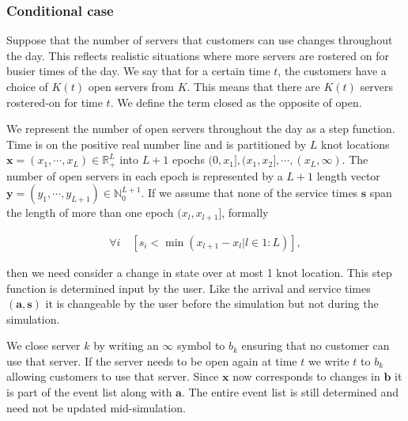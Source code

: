 \documentclass[article]{jss}
\begin{document}
\subsubsection{Conditional case}

Suppose that the number of servers that customers can use changes throughout the day. This reflects realistic situations where more servers are rostered on for busier times of the day. We say that for a certain time $t$, the customers have a choice of $K(t)$ open servers from $K$. This means that there are $K(t)$ servers rostered-on for time $t$. We define the term closed as the opposite of open. 

We represent the number of open servers throughout the day as a step function. Time is on the positive real number line and is partitioned by $L$ knot locations $\mathbf{x} = (x_1, \cdots, x_L ) \in \mathbb{R}^L_{+}$ into $L+1$ epochs $(0, x_1], (x_1, x_2], \cdots, (x_L, \infty)$. The number of open servers in each epoch is represented by a $L+1$ length vector $\mathbf{y} = (y_1, \cdots, y_{L+1} ) \in \mathbb{N}^{L+1}_0$. If we assume that none of the service times $\mathbf{s}$ span the length of more than one epoch $(x_{l}, x_{l+1}]$, formally

\begin{align}
\forall i \quad \left[ s_i < \min({ x_{l+1} - x_{l} | l \in 1:L }) \right] \label{eq:condition},
\end{align}

then we need consider a change in state over at most 1 knot location. This step function is determined input by the user. Like the arrival and service times $\mathbf{(a,s)}$ it is changeable by the user before the simulation but not during the simulation. 

We close server $k$ by writing an $\infty$ symbol to $b_k$ ensuring that no customer can use that server. If the server needs to be open again at time $t$ we write $t$ to $b_k$ allowing customers to use that server. Since $\mathbf{x}$ now corresponds to changes in $\mathbf{b}$ it is part of the event list along with $\mathbf{a}$. The entire event list is still determined and need not be updated mid-simulation. 
\end{document}
